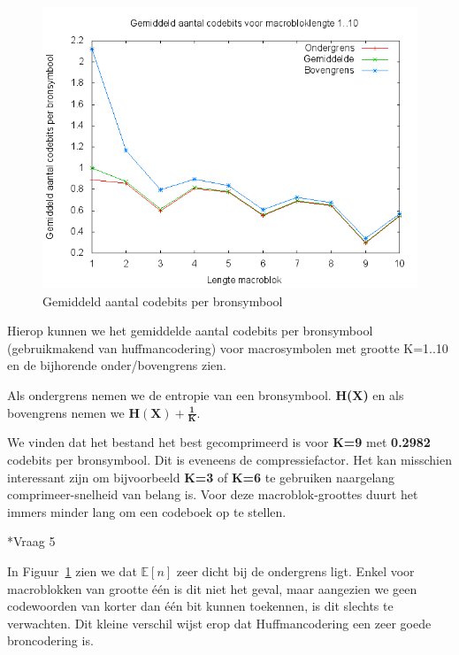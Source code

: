 \documentclass[]{article}
\begin{document}
\begin{section}
\begin{subsection}
        \begin{figure}[h]
            \centering
            \includegraphics[width=\textwidth]{vraag1_4.png}
            \caption{Gemiddeld aantal codebits per bronsymbool}
            \label{fig:codebits}
        \end{figure}

        Hierop kunnen we het gemiddelde aantal codebits per bronsymbool
        (gebruikmakend van huffmancodering) voor macrosymbolen met
        grootte K=1..10 en de bijhorende onder/bovengrens zien.

        Als ondergrens nemen we de entropie van een bronsymbool.
        \textbf{H(X)} en als bovengrens nemen we
        $\mathbf{H(X) +\frac{1}{K}}$.

        We vinden dat het bestand het best gecomprimeerd is voor
        \textbf{K=9} met \textbf{0.2982} codebits per bronsymbool. Dit
        is eveneens de compressiefactor. Het kan misschien  interessant
        zijn om bijvoorbeeld \textbf{K=3} of \textbf{K=6} te gebruiken
        naargelang comprimeer-snelheid van belang is. Voor deze
        macroblok-groottes duurt het immers minder lang om een codeboek
        op te stellen.
		
    \end{subsection}

    \begin{subsection}*{Vraag 5}

        In Figuur~\ref{fig:codebits} zien we dat $\mathbb{E}[n]$ zeer
        dicht bij de ondergrens ligt. Enkel voor macroblokken van
        grootte \'e\'en is dit niet het geval, maar aangezien we geen
        codewoorden van korter dan \'e\'en bit kunnen toekennen, is dit
        slechts te verwachten. Dit kleine verschil wijst erop dat
        Huffmancodering een zeer goede broncodering is.


\end{subsection}
\end{section}
\end{document}
